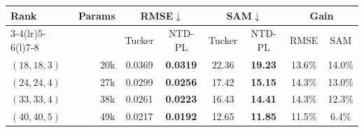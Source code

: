 \begin{tabular}{@{}l r cc cc cc@{}}
\toprule
Rank & Params & \multicolumn{2}{c}{RMSE$\downarrow$} & \multicolumn{2}{c}{SAM$\downarrow$} & \multicolumn{2}{c}{Gain} \\
\cmidrule(lr){3-4}\cmidrule(lr){5-6}\cmidrule(l){7-8}
 & & Tucker & NTD-PL & Tucker & NTD-PL & RMSE & SAM \\
\midrule
$(18,18,3)$ & 20k & 0.0369 & \textbf{0.0319} & 22.36 & \textbf{19.23} & 13.6\% & 14.0\% \\
$(24,24,4)$ & 27k & 0.0299 & \textbf{0.0256} & 17.42 & \textbf{15.15} & 14.3\% & 13.0\% \\
$(33,33,4)$ & 38k & 0.0261 & \textbf{0.0223} & 16.43 & \textbf{14.41} & 14.3\% & 12.3\% \\
$(40,40,5)$ & 49k & 0.0217 & \textbf{0.0192} & 12.65 & \textbf{11.85} & 11.5\% & 6.4\% \\
\bottomrule
\end{tabular}
